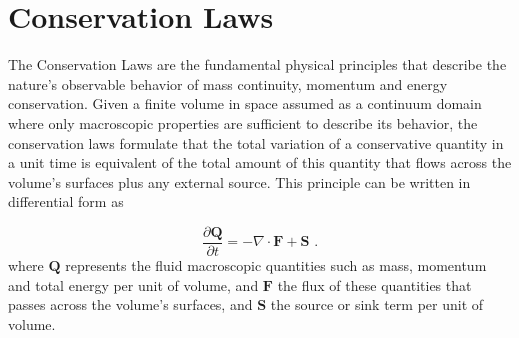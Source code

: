 \section{Conservation Laws}
The Conservation Laws are the fundamental physical principles that describe the nature's observable behavior of mass continuity, momentum and energy conservation. Given a finite volume in space assumed as a continuum domain where only macroscopic properties are sufficient to describe its behavior, the conservation laws formulate that the total variation of a conservative quantity in a unit time is equivalent of the total amount of this quantity that flows across the volume's surfaces plus any external source. This principle can be written in differential form as

\begin{equation}  \label{eq:eq_cons}
\frac{\partial \textbf{Q}}{\partial t} = -\nabla \cdot \textbf{F} + \textbf{S}
\mbox{ .}
\end{equation}
where $\textbf{Q}$ represents the fluid macroscopic quantities such as mass, momentum and total energy per unit of volume, and $\textbf{F}$ the flux of these quantities that passes across the volume's surfaces, and $\textbf{S}$ the source or sink term per unit of volume.

